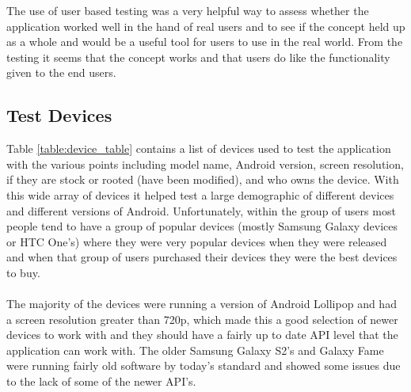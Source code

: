 \noindent
The use of user based testing was a very helpful way to assess whether the application worked well in the hand of real users and to see if the concept held up as a whole and would be a useful tool for users to use in the real world. From the testing it seems that the concept works and that users do like the functionality given to the end users.

\subsection{Test Devices}

Table \ref{table:device_table} contains a list of devices used to test the application with the various points including model name, Android version, screen resolution, if they are stock or rooted (have been modified), and who owns the device. With this wide array of devices it helped test a large demographic of different devices and different versions of Android. Unfortunately, within the group of users most people tend to have a group of popular devices (mostly Samsung Galaxy devices or HTC One's) where they were very popular devices when they were released and when that group of users purchased their devices they were the best devices to buy.\\
\\
The majority of the devices were running a version of Android Lollipop and had a screen resolution greater than 720p, which made this a good selection of newer devices to work with and they should have a fairly up to date API level that the application can work with. The older Samsung Galaxy S2's and Galaxy Fame were running fairly old software by today's standard and showed some issues due to the lack of some of the newer API's.

